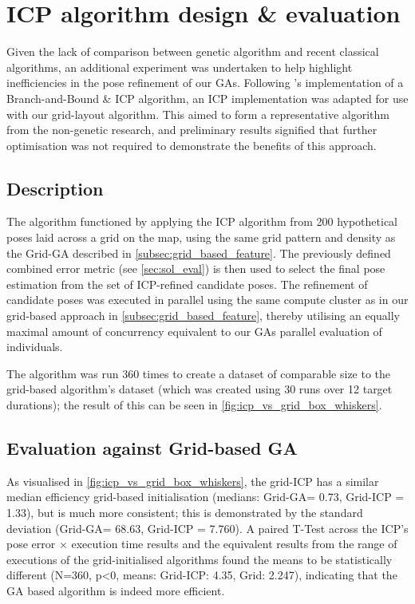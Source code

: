 \documentclass[authoryearcitations]{UoYCSproject}
\begin{document}
\chapter{ICP algorithm design \& evaluation}
\label{cha:icp_algorithm}
Given the lack of comparison between genetic algorithm and recent classical algorithms, an additional experiment was undertaken to help highlight inefficiencies in the pose refinement of our GAs. Following \citet{Yang2013-gx}'s implementation of a Branch-and-Bound \& ICP algorithm, an ICP implementation \cite{Harry_undated-ea} was adapted for use with our grid-layout algorithm. This aimed to form a representative algorithm from the non-genetic research, and preliminary results signified that further optimisation was not required to demonstrate the benefits of this approach.

\section{Description}
The algorithm functioned by applying the ICP algorithm from 200 hypothetical poses laid across a grid on the map, using the same grid pattern and density as the Grid-GA described in \autoref{subsec:grid_based_feature}. The previously defined combined error metric (see \autoref{sec:sol_eval}) is then used to select the final pose estimation from the set of ICP-refined candidate poses. The refinement of candidate poses was executed in parallel using the same compute cluster as in our grid-based approach in \autoref{subsec:grid_based_feature}, thereby utilising an equally maximal amount of concurrency equivalent to our GAs parallel evaluation of individuals.\newline

The algorithm was run 360 times to create a dataset of comparable size to the grid-based algorithm's dataset (which was created using 30 runs over 12 target durations); the result of this can be seen in \autoref{fig:icp_vs_grid_box_whiskers}. 


\section{Evaluation against Grid-based GA}
As visualised in \autoref{fig:icp_vs_grid_box_whiskers}, the grid-ICP has a similar median efficiency grid-based initialisation (medians: Grid-GA= 0.73, Grid-ICP = 1.33), but is much more consistent; this is demonstrated by the standard deviation (Grid-GA= 68.63, Grid-ICP = 7.760). A paired T-Test across the ICP's pose error $\times$ execution time results and the equivalent results from the range of executions of the grid-initialised algorithms found the means to be statistically different (N=360, p<0, means: Grid-ICP: 4.35, Grid: 2.247), indicating that the GA based algorithm is indeed more efficient. \newline
\end{document}
